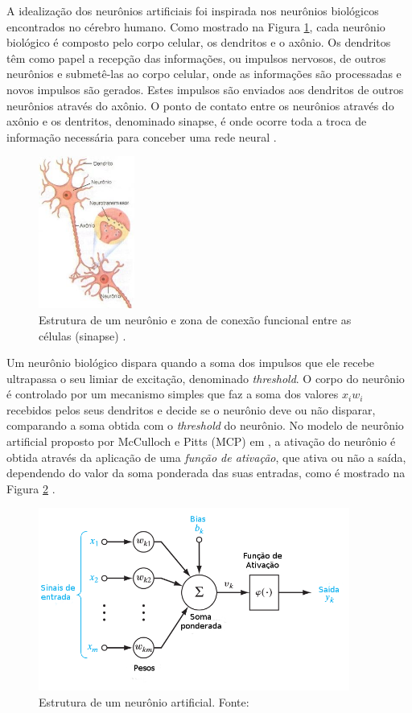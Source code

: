 A idealização dos neurônios artificiais foi inspirada nos neurônios biológicos encontrados no cérebro humano. Como mostrado na Figura \ref{fig:sinapse}, cada neurônio biológico é composto pelo corpo celular, os dendritos e o axônio. Os dendritos têm como papel a recepção das informações, ou impulsos nervosos, de outros neurônios e submetê-las ao corpo celular, onde as informações são processadas e novos impulsos são gerados. Estes impulsos são enviados aos dendritos de outros neurônios através do axônio. O ponto de contato entre os neurônios através do axônio e os dentritos, denominado sinapse, é onde ocorre toda a troca de informação necessária para conceber uma rede neural \cite{braga}.

\begin{figure}
\centering
\includegraphics[height=5cm]{imgs/sinapse}
\caption{Estrutura de um neurônio e zona de conexão funcional entre as células (sinapse) \cite{sinapse}.}
\label{fig:sinapse}
\end{figure}


Um neurônio biológico dispara quando a soma dos impulsos que ele recebe ultrapassa o seu limiar de excitação, denominado \emph{threshold}. O corpo do neurônio é controlado por um mecanismo simples que faz a soma dos valores $x_i w_i$ recebidos pelos seus dendritos e decide se o neurônio deve ou não disparar, comparando a soma obtida com o \emph{threshold} do neurônio. No modelo de neurônio artificial proposto por McCulloch e Pitts (MCP) em \cite{mcculloch}, a ativação do neurônio é obtida através da aplicação de uma \emph{função de ativação}, que ativa ou não a saída, dependendo do valor da soma ponderada das suas entradas, como é mostrado na Figura \ref{fig:neuronio-artificial} \cite{braga}.

\begin{figure}[H]
\centering
\includegraphics[height=6cm]{imgs/neuronio-artificial}
\caption{Estrutura de um neurônio artificial. Fonte: \cite{haykin}}
\label{fig:neuronio-artificial}
\end{figure}

